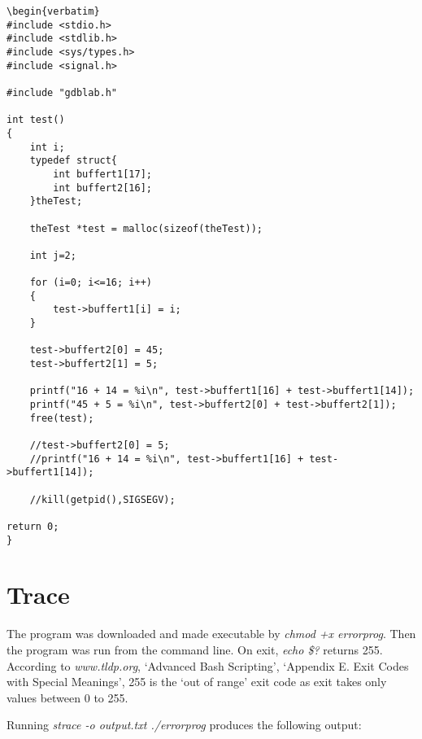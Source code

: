 \documentclass[a4paper,11pt,twoside]{article}
\begin{document}
\begin{verbatim}
\begin{verbatim}
#include <stdio.h>
#include <stdlib.h>
#include <sys/types.h>
#include <signal.h>

#include "gdblab.h"

int test()
{
	int i;
	typedef struct{
		int buffert1[17];
		int buffert2[16];
	}theTest;

	theTest *test = malloc(sizeof(theTest));

	int j=2;

	for (i=0; i<=16; i++)
	{
		test->buffert1[i] = i;
	}

	test->buffert2[0] = 45;
	test->buffert2[1] = 5;

	printf("16 + 14 = %i\n", test->buffert1[16] + test->buffert1[14]);
	printf("45 + 5 = %i\n", test->buffert2[0] + test->buffert2[1]);
	free(test);

	//test->buffert2[0] = 5;
	//printf("16 + 14 = %i\n", test->buffert1[16] + test->buffert1[14]);

	//kill(getpid(),SIGSEGV);

return 0;
}

\end{verbatim}

\section{Trace}
The program was downloaded and made executable by \textit{chmod +x errorprog}. Then the program was run from the command line. On exit, \textit{echo \$?} returns 255. According to \textit{www.tldp.org}, `Advanced Bash Scripting', `Appendix E. Exit Codes with Special Meanings', 255 is the `out of range' exit code as exit takes only values between 0 to 255.

Running \textit{strace -o output.txt ./errorprog} produces the following output:
\end{document}
